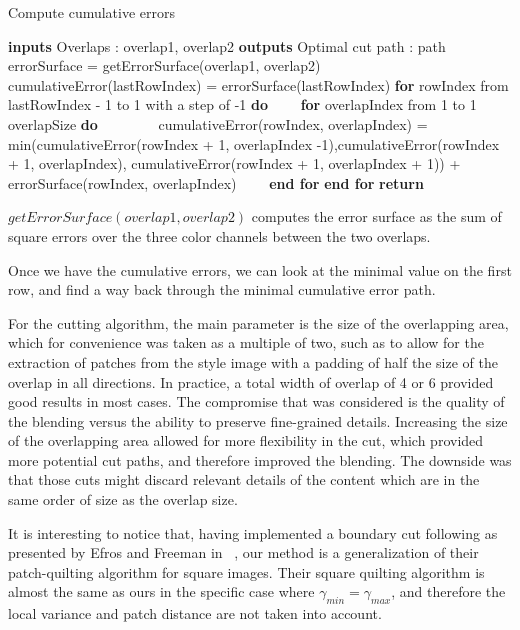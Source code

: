 \documentclass[a4paper]{article}
\begin{document}
\begin{algorithm}
\caption{Compute cumulative errors}\label{patch-cut-algo}
\begin{algorithmic}[1]
\Statex \textbf{inputs} Overlaps : overlap1, overlap2
\Statex \textbf{outputs} Optimal cut path : path 
\Statex errorSurface = getErrorSurface(overlap1, overlap2)
\Statex cumulativeError(lastRowIndex) = errorSurface(lastRowIndex) 
\Statex \textbf{for} rowIndex from lastRowIndex - 1 to 1 with a step of -1  \textbf{do}
\Statex ~~~~\textbf{for} overlapIndex from 1 to 1 overlapSize \textbf{do}
\Statex ~~~~~~~~cumulativeError(rowIndex, overlapIndex) = min(cumulativeError(rowIndex + 1, overlapIndex -1),cumulativeError(rowIndex + 1, overlapIndex), cumulativeError(rowIndex + 1, overlapIndex + 1)) + errorSurface(rowIndex, overlapIndex)
\Statex ~~~~\textbf{end for}
\Statex \textbf{end for}
\Statex \textbf{return}
\end{algorithmic}
\end{algorithm}


$getErrorSurface(overlap1, overlap2)$ computes the error surface as the sum of square errors over the three color channels between the two overlaps.

Once we have the cumulative errors, we can look at the minimal value on the first row, and find a way back through the minimal cumulative error path. 

For the cutting algorithm, the main parameter is the size of the overlapping area, which for convenience was taken as a multiple of two, such as to allow for the extraction of patches from the style image with a padding of half the size of the overlap in all directions. In practice, a total width of overlap of 4 or 6 provided good results in most cases. The compromise that was considered is the quality of the blending versus the ability to preserve fine-grained details. Increasing the size of the overlapping area allowed for more flexibility in the cut, which provided more potential cut paths, and therefore improved the blending. The downside was that those cuts might discard relevant details of the content which are in the same order of size as the overlap size.  

It is interesting to notice that, having implemented a boundary cut following as presented by Efros and Freeman in ~\cite{quilting}, our method is a generalization of their patch-quilting algorithm for square images. Their square quilting algorithm is almost the same as ours in the specific case where ${\gamma_{min} = \gamma_{max}}$, and therefore the local variance and patch distance are not taken into account. 
\end{document}

